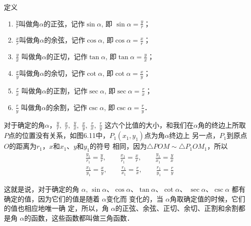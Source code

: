 \begin{blk}{定义}
    \begin{enumerate}
\item $\frac{y}{r}$叫做角$\alpha$的正弦，记作$\sin\alpha$, 即
$\sin\alpha=\frac{y}{r}$；
\item $\frac{x}{r}$叫做角$\alpha$的余弦，记作$\cos\alpha$, 即$\cos\alpha=\frac{x}{r}$；
\item $\frac{y}{x}$
叫做角$\alpha$的正切，记作$\tan\alpha$, 即$\tan\alpha=\frac{y}{x}$；
\item $\frac{x}{y}$叫做角$\alpha$的余切，记作$\cot\alpha$, 即$\cot\alpha=\frac{x}{y}$；
\item $\frac{r}{x}$
叫做角$\alpha$的正割，记作$\sec\alpha$, 即$\sec\alpha=\frac{r}{x}$；
\item $\frac{r}{y}$
叫做角$\alpha$的余割，记作$\csc\alpha$, 即$\csc\alpha=\frac{r}{y}$．        
    \end{enumerate}
\end{blk}

对于确定的角$\alpha$，$\frac{y}{r},\; \frac{x}{r},\; \frac{y}{x},\; \frac{x}{y},\; \frac{r}{x},\; \frac{r}{y}$
这六个比值的大小，和我们在$\alpha$角的终边上所取$P$点的位置没有关系，如图6.11中，$P_1(x_1,y_1)$点为角$\alpha$终边上
另一点，$P_1$到原点$O$的距离为$r_1$，$x$和$x_1$、$y$和$y_1$的符号
相同，因为$\triangle POM\sim \triangle P_1OM_1$，所以
\[\begin{split}
   & \frac{y_1}{r_1}=\frac{y}{r},\qquad \frac{x_1}{r_1}=\frac{x}{r},\qquad \frac{y_1}{x_1}=\frac{y}{x}\\
   &\frac{x_1}{y_1}=\frac{x}{y},\qquad  \frac{r_1}{x_1}= \frac{r}{x},\qquad \frac{r_1}{y_1}=\frac{r}{y}
\end{split}\]

\begin{figure}[htp]
    \centering
{}
    \caption{}
\end{figure}

这就是说，对于确定的角 $\alpha$, $\sin\alpha$、$\cos \alpha$、$\tan \alpha$、$\cot \alpha$、
$\sec\alpha$、$\csc\alpha$
都有确定的值，因为它们的值是随着 $\alpha$变化而
变化的，当 $\alpha$角取确定值的时候，它们的值也相应地唯一确
定，所以，角 $\alpha$的正弦、余弦、正切、余切、正割和余割都
是角 $\alpha$的函数，这些函数都叫做三角函数．

